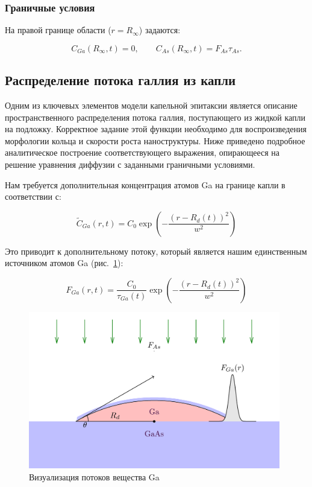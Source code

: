 \documentclass[14pt,oneside]{extarticle}
\begin{document}
\subsubsection*{Граничные условия}

На правой границе области ($r = R_\infty$) задаются:

\begin{equation}
C_{Ga}\left(R_{\infty},t\right)=0, \qquad
C_{As}\left(R_{\infty},t\right)=F_{As}\tau_{As}.
\end{equation}

\subsection{Распределение потока галлия из капли}

Одним из ключевых элементов модели капельной эпитаксии является описание пространственного распределения потока галлия, поступающего из жидкой капли на подложку. Корректное задание этой функции необходимо для воспроизведения морфологии кольца и скорости роста наноструктуры. Ниже приведено подробное аналитическое построение соответствующего выражения, опирающееся на решение уравнения диффузии с заданными граничными условиями.

Нам требуется дополнительная концентрация атомов Ga на границе капли в соответствии с:

\begin{equation}
\tilde{C}_{Ga}\left(r,t\right)=C_{0}\exp\left(-\frac{\left(r-R_{d}\left(t\right)\right)^{2}}{w^{2}}\right)
\end{equation}

Это приводит к дополнительному потоку, который является нашим единственным источником атомов Ga (рис.~\ref{fig:first}):

\begin{equation}
F_{Ga}\left(r,t\right)=\frac{C_{0}}{\tau_{Ga}\left(t\right)}\exp\left(-\frac{\left(r-R_{d}\left(t\right)\right)^{2}}{w^{2}}\right)
\end{equation}

\begin{figure}
    \begin{center}
        \includegraphics[width=11cm]{images/first.png}
        \caption{\label{fig:first}
        Визуализация потоков вещества Ga}
    \end{center}
\end{figure}
\end{document}
